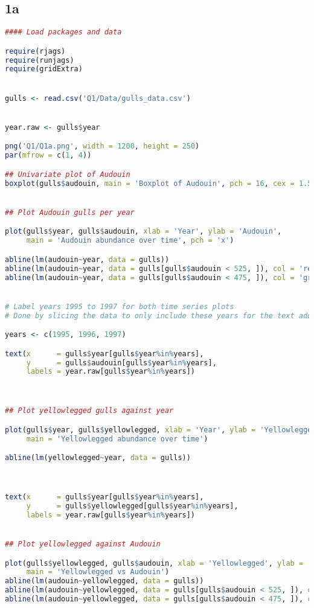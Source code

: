 \documentclass[11pt]{article}
\begin{document}
\subsection{1a} \label{appA1a}
\begin{lstlisting}[language=R]
#### Load packages and data

require(rjags)
require(runjags)
require(gridExtra)


gulls <- read.csv('Q1/Data/gulls_data.csv')


year.raw <- gulls$year

png('Q1/Q1a.png', width = 1200, height = 250)
par(mfrow = c(1, 4))

## Univariate plot of Audouin
boxplot(gulls$audouin, main = 'Boxplot of Audouin', pch = 16, cex = 1.5)


## Plot Audouin gulls per year

plot(gulls$year, gulls$audouin, xlab = 'Year', ylab = 'Audouin', 
     main = 'Audouin abundance over time', pch = 'x')

abline(lm(audouin~year, data = gulls))
abline(lm(audouin~year, data = gulls[gulls$audouin < 525, ]), col = 'red')
abline(lm(audouin~year, data = gulls[gulls$audouin < 475, ]), col = 'green')


# Label years 1995 to 1997 for both time series plots
# Done by slicing the data to only include these years for the text addition

years <- c(1995, 1996, 1997)

text(x      = gulls$year[gulls$year%in%years], 
     y      = gulls$audouin[gulls$year%in%years], 
     labels = year.raw[gulls$year%in%years])



## Plot yellowlegged gulls against year

plot(gulls$year, gulls$yellowlegged, xlab = 'Year', ylab = 'Yellowlegged', 
     main = 'Yellowlegged abundance over time')

abline(lm(yellowlegged~year, data = gulls))



text(x      = gulls$year[gulls$year%in%years], 
     y      = gulls$yellowlegged[gulls$year%in%years], 
     labels = year.raw[gulls$year%in%years])


## Plot yellowlegged against Audouin

plot(gulls$yellowlegged, gulls$audouin, xlab = 'Yellowlegged', ylab = 'Audouin', 
     main = 'Yellowlegged vs Audouin')
abline(lm(audouin~yellowlegged, data = gulls))
abline(lm(audouin~yellowlegged, data = gulls[gulls$audouin < 525, ]), col='red')
abline(lm(audouin~yellowlegged, data = gulls[gulls$audouin < 475, ]), col='green')


\end{lstlisting}
\end{document}
